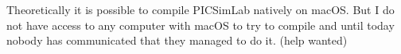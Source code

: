 Theoretically it is possible to compile PICSimLab natively on macOS. But I do not have access to any computer
 with macOS to try to compile and until today nobody has communicated that they managed to do it. (help wanted) 


% 
 
